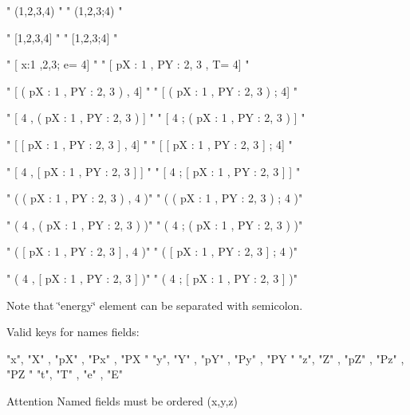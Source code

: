 \begin{DoxyCode}
    " (1,2,3,4) "
    " (1,2,3;4) "

    " [1,2,3,4] "
    " [1,2,3;4] "

    " [ x:1 ,2,3; e= 4] "
    " [ pX : 1 , PY : 2, 3 , T= 4] "

    " [ ( pX : 1 , PY : 2, 3 ) , 4] "
    " [ ( pX : 1 , PY : 2, 3 ) ; 4] "

    " [ 4 , ( pX : 1 , PY : 2, 3 ) ] "
    " [ 4 ; ( pX : 1 , PY : 2, 3 ) ] "

    " [ [ pX : 1 , PY : 2, 3 ] , 4] "
    " [ [ pX : 1 , PY : 2, 3 ] ; 4] "

    " [ 4 , [ pX : 1 , PY : 2, 3 ] ] "
    " [ 4 ; [ pX : 1 , PY : 2, 3 ] ] "

    " ( ( pX : 1 , PY : 2, 3 ) , 4 )"
    " ( ( pX : 1 , PY : 2, 3 ) ; 4 )"

    " ( 4 , ( pX : 1 , PY : 2, 3 ) )"
    " ( 4 ; ( pX : 1 , PY : 2, 3 ) )"

    " ( [ pX : 1 , PY : 2, 3 ] , 4 )"
    " ( [ pX : 1 , PY : 2, 3 ] ; 4 )"

    " ( 4 , [ pX : 1 , PY : 2, 3 ] )"
    " ( 4 ; [ pX : 1 , PY : 2, 3 ] )"
\end{DoxyCode}


Note that \char`\"{}energy\char`\"{} element can be separated with semicolon.

Valid keys for names fields:


\begin{DoxyCode}
    "x", "X" , "pX" , "Px" , "PX "
    "y", "Y" , "pY" , "Py" , "PY "
    "z", "Z" , "pZ" , "Pz" , "PZ "
    "t", "T" , "e"  , "E"
\end{DoxyCode}


\begin{DoxyAttention}{Attention}
Named fields must be ordered {\ttfamily (x,y,z)}
\end{DoxyAttention}

